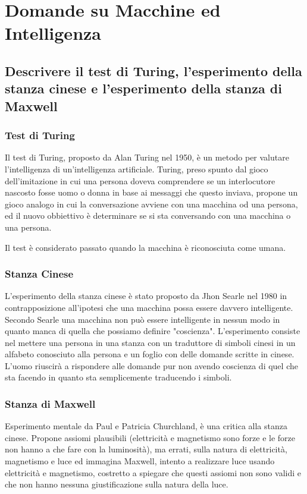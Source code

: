 \documentclass[\main/main.tex]{subfiles}
\begin{document}
\section{Domande su Macchine ed Intelligenza}
\subsection{Descrivere il test di Turing, l'esperimento della stanza cinese e l'esperimento della stanza di Maxwell}
\subsubsection{Test di Turing}
Il test di Turing, proposto da Alan Turing nel 1950, è un metodo per valutare l'intelligenza di un'intelligenza artificiale. Turing, preso spunto dal gioco dell'imitazione in cui una persona doveva comprendere se un interlocutore nascosto fosse uomo o donna in base ai messaggi che questo inviava, propone un gioco analogo in cui la conversazione avviene con una macchina od una persona, ed il nuovo obbiettivo è determinare se si sta conversando con una macchina o una persona.

Il test è considerato passato quando la macchina è riconosciuta come umana.

\subsubsection{Stanza Cinese}
L'esperimento della stanza cinese è stato proposto da Jhon Searle nel 1980 in contrapposizione all'ipotesi che una macchina possa essere davvero intelligente. Secondo Searle una macchina non può essere intelligente in nessun modo in quanto manca di quella che possiamo definire "coscienza". L'esperimento consiste nel mettere una persona in una stanza con un traduttore di simboli cinesi in un alfabeto conosciuto alla persona e un foglio con delle domande scritte in cinese. L'uomo riuscirà a rispondere alle domande pur non avendo coscienza di quel che sta facendo in quanto sta semplicemente traducendo i simboli.

\subsubsection{Stanza di Maxwell}
Esperimento mentale da Paul e Patricia Churchland, è una critica alla stanza cinese. Propone assiomi plausibili (elettricità e magnetismo sono forze e le forze non hanno a che fare con la luminosità), ma errati, sulla natura di elettricità, magnetismo e luce ed immagina Maxwell, intento a realizzare luce usando elettricità e magnetismo, costretto a spiegare che questi assiomi non sono validi e che non hanno nessuna giustificazione sulla natura della luce.
\end{document}
